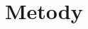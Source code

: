 \documentclass[11pt, a4paper]{article}
\begin{document}
\begin{sloppypar}
    \section{Metody}



\end{sloppypar}
\end{document}

